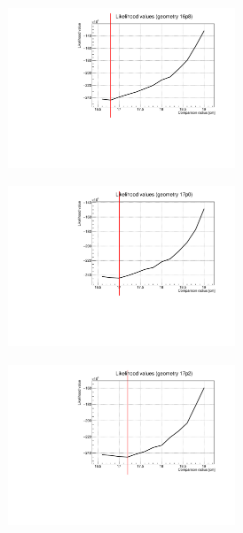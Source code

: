 \documentclass[a4paper, 11pt]{report}
\begin{document}
\begin{figure}[htbp]
\centering
\begin{minipage}[b]{.32\textwidth}
\includegraphics[width=6cm, height=4.6cm]{figs/likelihood100LowStat/likelihood16p8.pdf}
\end{minipage}\hfill
\begin{minipage}[b]{.32\textwidth}
\includegraphics[width=6cm, height=4.6cm]{figs/likelihood100LowStat/likelihood17p0.pdf}
\end{minipage} \hfill
\begin{minipage}[b]{.32\textwidth}
\includegraphics[width=6cm, height=4.6cm]{figs/likelihood100LowStat/likelihood17p2.pdf}
\end{minipage} \hfill \vspace{10pt}


\end{figure}
\end{document}
